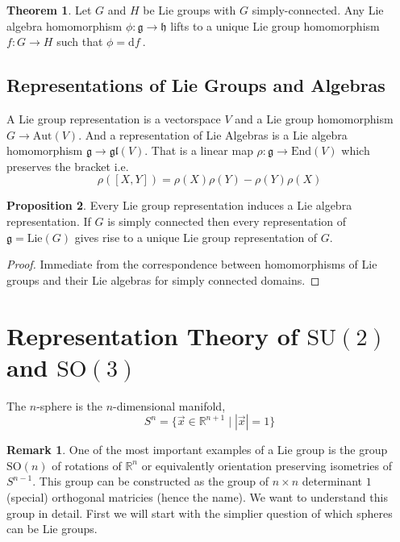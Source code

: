 \documentclass[12pt]{extarticle}
\newcommand{\R}{\mathbb{R}}
\newcommand{\End}[1]{\mathrm{End}\left(#1\right)}
\renewcommand{\d}[1]{ \mathrm{d}#1 \:}
\theoremstyle{definition}
\newtheorem{theorem}{Theorem}[section]
\newtheorem{proposition}[theorem]{Proposition}
\newtheorem{remark}{Remark}
\newenvironment{definition}[1][Definition:]{\begin{trivlist}
\item[\hskip \labelsep {\bfseries #1}]}{\end{trivlist}}
\newcommand{\SO}[1]{\mathrm{SO}\left(#1\right)}
\newcommand{\SU}[1]{\mathrm{SU}\left(#1\right)}
\newcommand{\g}{\mathfrak{g}}
\newcommand{\h}{\mathfrak{h}}
\newcommand{\gl}[1]{\mathfrak{gl}\left(#1\right)}
\newcommand{\Lie}[1]{\mathrm{Lie}\left(#1 \right)}
\newcommand{\Aut}[1]{\mathrm{Aut}\left(#1 \right)}
\begin{document}
\begin{theorem}
Let $G$ and $H$ be Lie groups with $G$ simply-connected. Any Lie algebra homomorphism $\phi : \g \to \h$ lifts to a unique Lie group homomorphism $f : G  \to H$ such that $\phi = \d{f}$. 
\end{theorem}


\subsection{Representations of Lie Groups and Algebras}

\begin{definition}
A Lie group representation is a vectorspace $V$ and a Lie group homomorphism $G \to \Aut{V}$. And a representation of Lie Algebras is a Lie algebra homomorphism $\g \to \gl{V}$. That is a linear map $\rho : \g \to \End{V}$ which preserves the bracket i.e.
\[ \rho([X, Y]) = \rho(X) \rho(Y) - \rho(Y) \rho(X) \]
\end{definition}

\begin{proposition}
Every Lie group representation induces a Lie algebra representation. If $G$ is simply connected then every representation of $\g = \Lie{G}$  gives rise to a unique Lie group representation of $G$.
\end{proposition}

\begin{proof}
Immediate from the correspondence between homomorphisms of Lie groups and their Lie algebras for simply connected domains.
\end{proof}

\section{Representation Theory of $\SU{2}$ and $\SO{3}$}

\begin{definition}
The $n$-sphere is the $n$-dimensional manifold,
\[ S^n = \{ \vec{x} \in \R^{n+1} \mid |\vec{x}| = 1 \} \]
\end{definition}

\begin{remark}
One of the most important examples of a Lie group is the group $\SO{n}$ of rotations of $\R^n$ or equivalently orientation preserving isometries of $S^{n-1}$. This group can be constructed as the group of $n \times n$ determinant $1$ (special) orthogonal matricies (hence the name). We want to understand this group in detail. First we will start with the simplier question of which spheres can be Lie groups.
\end{remark}
\end{document}
